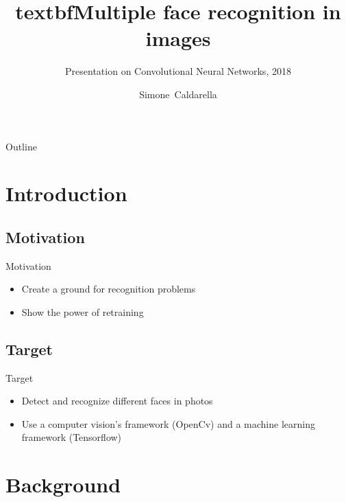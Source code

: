 \documentclass{beamer}
\title[Face recognition]{textbf{Multiple face recognition in images}}
\subtitle{Presentation on Convolutional Neural Networks, 2018}
\author[Simone Caldarella]
{Simone~Caldarella }
\institute[University of Brescia] 
{
  	IEEE Student Branch Brescia\\
  	University of Brescia
}
\date[IEEE Student Branch 2018] 
{
	
}
\begin{document}
\begin{frame}
 	\titlepage
\end{frame}

\begin{frame}{Outline}
	\begin{multicols}{2}
  		\tableofcontents
	\end{multicols}
\end{frame}


\section{Introduction}

\subsection{Motivation}

\begin{frame}{Motivation}
	\begin{itemize}
		[triangle]
		\item
    			Create a ground for recognition problems
		\item
			Show the power of retraining
	\end{itemize}
\end{frame}


\subsection{Target}
\begin{frame}{Target}
	\begin{itemize}
	[triangle]
		\item
    			Detect and recognize different faces in photos
		\item
			Use a computer vision's framework (OpenCv) and a machine learning framework (Tensorflow)
	\end{itemize}
\end{frame}


\section{Background}
\end{document}
